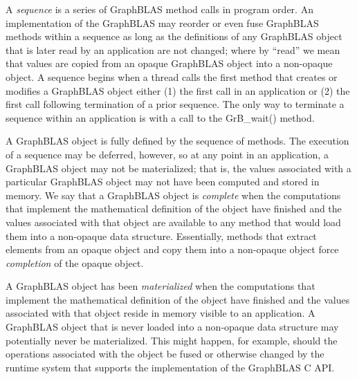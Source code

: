  A \emph{sequence} is a series of GraphBLAS method calls in program order.  
An implementation of the GraphBLAS may reorder or even fuse GraphBLAS methods within a 
sequence as long as the definitions of any GraphBLAS object that is later read by an application 
are not changed; where by ``read'' we mean that values are copied from an opaque GraphBLAS 
object into a non-opaque object.  A sequence begins when a thread calls the first method that creates
or modifies a GraphBLAS object either (1) the first call in an application or (2) the first call 
following termination of a prior sequence.  The only way to terminate a sequence within an 
application is with a call to the {\sf GrB\_wait()} method. 

 A GraphBLAS object is fully defined by the sequence of methods.   
The execution of a sequence may be deferred, however, so at any point 
in an application, a GraphBLAS object may not be materialized; that is, 
the values associated with a particular GraphBLAS object may not have 
been computed and stored in memory.   We say that a GraphBLAS object is \emph{complete} 
when the computations that implement the mathematical definition of the object have 
finished and the values associated with that object are available to any method that would 
load them into a non-opaque data structure.   Essentially, methods that extract elements 
from an opaque object and copy them into a non-opaque object force \emph{completion} of the
opaque object. 

 A GraphBLAS object has been \emph{materialized} when 
the computations that implement the mathematical definition of the object 
have finished and the values associated with that object reside in memory visible to an application.   
A GraphBLAS object that is never loaded into a non-opaque data structure may 
potentially never be materialized.  This might happen, for  example, should the operations 
associated with the object be fused or otherwise changed by the runtime system 
that supports the implementation of the GraphBLAS C API.   

